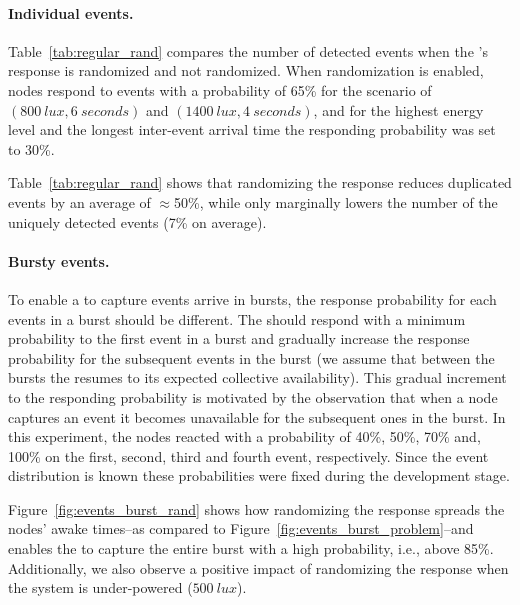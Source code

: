 \paragraph{Individual events.} 
Table~\ref{tab:regular_rand} compares the number of detected events when the \cim's response is randomized and not randomized.
When randomization is enabled, nodes respond to events with a probability of 65\% for the scenario of $\left(\SI{800}{lux}, \SI{6}{seconds}\right)$ and $\left(\SI{1400}{lux}, \SI{4}{seconds}\right)$, and for the highest energy level and the longest inter-event arrival time the responding probability was set to 30\%.

Table~\ref{tab:regular_rand} shows that randomizing the response reduces duplicated events by an average of $\approx$50\%, while only marginally lowers the number of the uniquely detected events (7\% on average). 

\paragraph{Bursty events.}
To enable a \cis to capture events arrive in bursts, the response probability for each events in a burst should be different. The \cis should respond with a minimum probability to the first event in a burst and gradually increase the response probability for the subsequent events in the burst (we assume that between the bursts the \cis resumes to its expected collective availability). This gradual increment to the responding probability is motivated by the observation that when a node captures an event it becomes unavailable for the subsequent ones in the burst.
In this experiment, the nodes reacted with a probability of 40\%, 50\%, 70\% and, 100\% on the first, second, third and fourth event, respectively. Since the event distribution is known these probabilities were fixed during the development stage.

Figure~\ref{fig:events_burst_rand} shows how randomizing the \cis response spreads the nodes' awake times--as compared to Figure~\ref{fig:events_burst_problem}--and enables the \cis to capture the entire burst with a high probability, i.e., above 85\%. Additionally, we also observe a positive impact of randomizing the response when the system is under-powered ($\SI{500}{lux}$).




